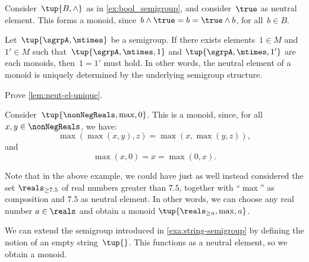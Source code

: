 \begin{example}
  \label{ex:bool_monoid}
  Consider~$\tup{B,\wedge}$ as in \cref{ex:bool_semigroup}, and consider~$\true$ as neutral element. This forms a monoid, since~$b\wedge \true=b=\true \wedge b$, for all~$b\in B$.
\end{example}

\begin{lemma}
  \label{lem:neut-el-unique}
  Let~$\tup{\sgrpA, \mtimes}$ be a semigroup. If there exists elements~$1 \in M$ and~$1' \in M$ such that~$\tup{\sgrpA, \mtimes, 1}$ and $\tup{\sgrpA, \mtimes, 1'}$ are each monoids, then~$1 = 1'$ must hold.
  In other words, the neutral element of a monoid is uniquely determined by the underlying semigroup structure.
\end{lemma}

\begin{gradedexercise}
  Prove \cref{lem:neut-el-unique}.
\end{gradedexercise}
\begin{solution}
\end{solution}

\begin{example}
  Consider~$\tup{\nonNegReals,\max,0}$. This is a monoid, since, for all~$x,y\in \nonNegReals$, we have:
  \begin{equation*}
    \max(\max(x,y),z)=\max(x,\max(y,z)),
  \end{equation*}
  and
  \begin{equation*}
    \max(x,0)=x=\max(0,x).
  \end{equation*}
\end{example}

\begin{remark}
  Note that in the above example, we could have just as well instead considered the set $\reals_{\geq 7.5}$ of real numbers greater than $7.5$, together with ``$\max$'' as composition and $7.5$ as neutral element.
  In other words, we can choose any real number $a \in \reals$ and obtain a monoid $\tup{\reals_{\geq a},\max, a}$.
\end{remark}




\begin{example}
  \label{exa:string-monoid}
  We can extend the semigroup introduced in \cref{exa:string-semigroup} by defining the notion of an empty string~$\tup{}$.
  This functions as a neutral element, so we obtain a monoid.
\end{example}


